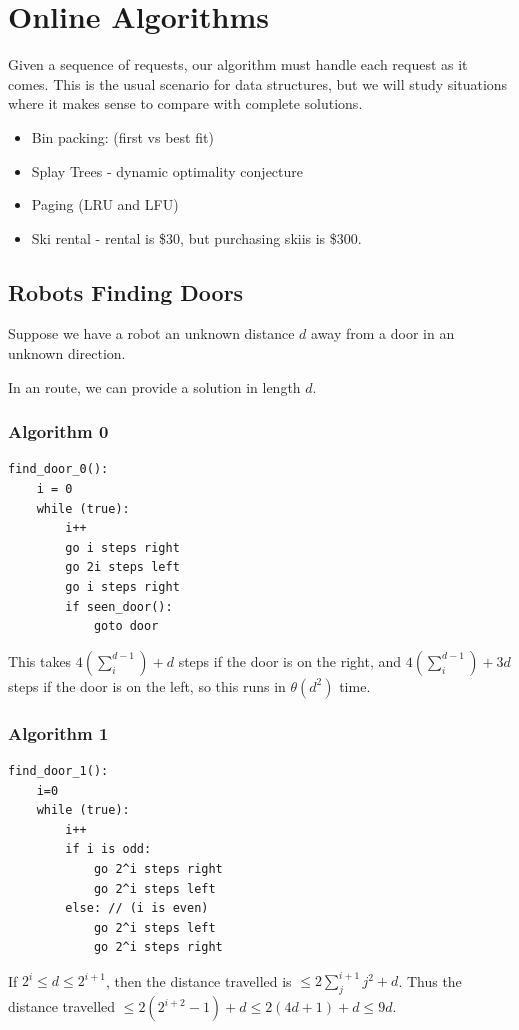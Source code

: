         \chapter{Online Algorithms} %
        \label{cha:online_algorithms}
            Given a sequence of requests, our algorithm must handle each request as it comes.
            This is the usual scenario for data structures, but we will study situations where it makes sense to compare with complete solutions.

            \begin{itemize}
                \item Bin packing: (first vs best fit)
                \item Splay Trees - dynamic optimality conjecture
                \item Paging (LRU and LFU)
                \item Ski rental - rental is \$30, but purchasing skiis is \$300.
            \end{itemize}

            \section{Robots Finding Doors} %
            \label{sec:robots_finding_doors}
                Suppose we have a robot an unknown distance $d$ away from a door in an unknown direction.

                In an \opt route, we can provide a solution in length $d$.

                \subsection{Algorithm 0} %
                \label{sub:algorithm_0}
                    \begin{verbatim}
find_door_0():
    i = 0
    while (true):
        i++
        go i steps right
        go 2i steps left
        go i steps right
        if seen_door():
            goto door
                    \end{verbatim}
                    This takes $4(\sum_i^{d-1}) + d$ steps if the door is on the right, and $4(\sum_i^{d-1}) + 3d$ steps if the door is on the left, so this runs in $\theta(d^2)$ time.
                \subsection{Algorithm 1} %
                \label{sub:algorithm_1}
                    \begin{verbatim}
find_door_1():
    i=0
    while (true):
        i++
        if i is odd:
            go 2^i steps right
            go 2^i steps left
        else: // (i is even)
            go 2^i steps left
            go 2^i steps right
                    \end{verbatim}
                    If $2^i \le d \le 2^{i+1}$, then the distance travelled is $\le 2\sum_j^{i+1} j^2 + d$.
                    Thus the distance travelled $\le 2 (2^{i+2} - 1) + d \le 2 (4d + 1) + d \le 9d$.

